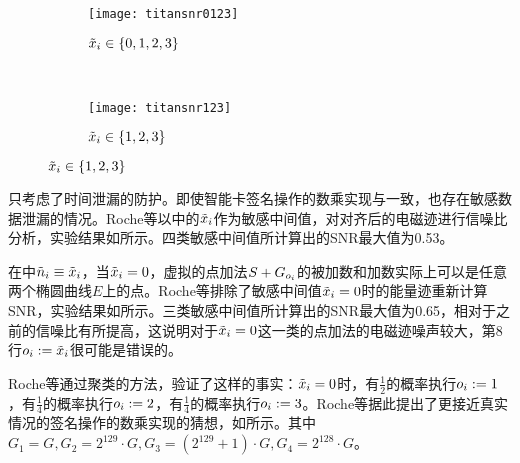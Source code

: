 {	\begin{figure}[!htb]
		\centering
		\begin{subfigure}[b]{\textwidth}
			\texttt{[image: titansnr0123]}
			\caption{$\tilde {x}_i\in\{0,1,2,3\}$}
			\label{fig:titansnr0123}
		\end{subfigure}%
		\\%
		\begin{subfigure}[b]{\textwidth}
			\texttt{[image: titansnr123]}
			\caption{$\tilde {x}_i\in\{1,2,3\}$}
			\label{fig:titansnr123}
		\end{subfigure}
		\label{fig:titansnr}
	\end{figure}
	
	只考虑了时间泄漏的防护。即使智能卡签名操作的数乘实现与一致，也存在敏感数据泄漏的情况。Roche等\citep{Roche21}以中的$\tilde {x}_i$作为敏感中间值，对对齐后的电磁迹进行信噪比分析，实验结果如所示。四类敏感中间值所计算出的SNR最大值为0.53。
	
	在中$\tilde {n}_i\equiv \tilde{x}_i$，当$\tilde {x}_i=0$，虚拟的点加法$S+G_{o_i}$的被加数和加数实际上可以是任意两个椭圆曲线$E$上的点。Roche等\citep{Roche21}排除了敏感中间值$\tilde {x}_i=0$时的能量迹重新计算SNR，实验结果如所示。三类敏感中间值所计算出的SNR最大值为0.65，相对于之前的信噪比有所提高，这说明对于$\tilde {x}_i=0$这一类的点加法的电磁迹噪声较大，第8行$o_i:=\tilde {x}_i$很可能是错误的。
	
	Roche等\citep{Roche21}通过聚类的方法，验证了这样的事实：$\tilde {x}_i=0$时，有$\frac12$的概率执行$o_i:=1$，有$\frac14$的概率执行$o_i:=2$，有$\frac14$的概率执行$o_i:=3$。Roche等\citep{Roche21}据此提出了更接近真实情况的签名操作的数乘实现的猜想，如所示。其中$G_1=G,G_2=2^{129}\cdot G,G_3=\left(2^{129}+1 \right) \cdot G,G_4=2^{128}\cdot G$。
	
}
